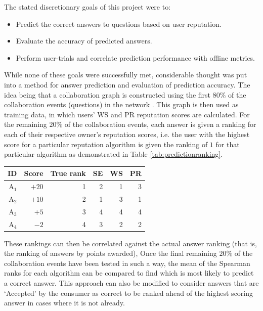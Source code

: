 \documentclass[]{final_report}
\begin{document}
The stated discretionary goals of this project were to:
\begin{itemize}
\item Predict the correct answers to questions based on user reputation.
\item Evaluate the accuracy of predicted answers.
\item Perform user-trials and correlate prediction performance with offline metrics.
\end{itemize}
While none of these goals were successfully met, considerable thought was put into a method for answer prediction and evaluation of prediction accuracy. The idea being that a collaboration graph is constructed using the first $80\%$ of the collaboration events (questions) in the network . This graph is then used as training data, in which users' WS and PR reputation scores are calculated. For the remaining $20\%$ of the collaboration events, each answer is given a ranking for each of their respective owner's reputation scores, i.e. the user with the highest score for a particular reputation algorithm is given the ranking of $1$ for that particular algorithm as demonstrated in Table \ref{tab:predictionranking}.

\begin{minipage}{\linewidth}
\centering
\begin{tabular}{|r|r|r|r|r|r|}
\hline
\textbf{ID}		& \textbf{Score} & \textbf{True rank} & \textbf{SE} & \textbf{WS} & \textbf{PR} \\ \hline\hline
A$_{1}$	& $+20$	&		1	&  2 &  1 &  3 \\ \hline
A$_{2}$	& $+10$	& 		2	&  1 &  3 &  1 \\ \hline
A$_{3}$	&  $+5$	& 		3	&  4 &  4 &  4 \\ \hline
A$_{4}$	&  $-2$	& 		4	&  3 &  2 &  2 \\ \hline
\end{tabular}\par
{} 
\label{tab:predictionranking}
\end{minipage}

These rankings can then be correlated against the actual answer ranking (that is, the ranking of answers by points awarded), Once the final remaining $20\%$ of the collaboration events have been tested in such a way, the mean of the Spearman ranks for each algorithm can be compared to find which is most likely to predict a correct answer. This approach can also be modified to consider answers that are `Accepted' by the consumer as correct to be ranked ahead of the highest scoring answer in cases where it is not already.
\end{document}
